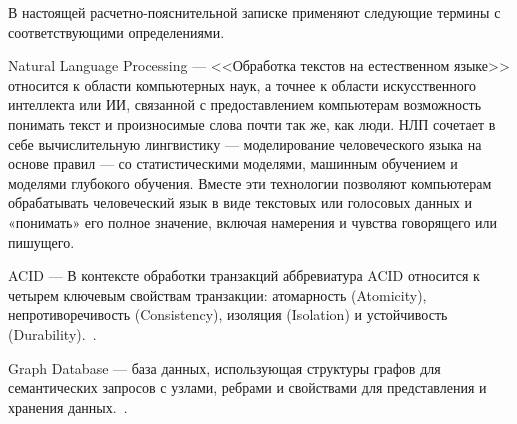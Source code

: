 
В настоящей расчетно-пояснительной записке применяют следующие термины с соответствующими определениями.\\

\begin{description}
	\item{Natural Language Processing} --- <<Обработка текстов на естественном языке>> относится к области компьютерных наук, а точнее к области искусственного интеллекта или ИИ, связанной с предоставлением компьютерам возможность понимать текст и произносимые слова почти так же, как люди.
   НЛП сочетает в себе вычислительную лингвистику — моделирование человеческого языка на основе правил — со статистическими моделями, машинным обучением и моделями глубокого обучения. Вместе эти технологии позволяют компьютерам обрабатывать человеческий язык в виде текстовых или голосовых данных и «понимать» его полное значение, включая намерения и чувства говорящего или пишущего.~\cite{nlp}
	\item{ACID} --- В контексте обработки транзакций аббревиатура ACID относится к четырем ключевым свойствам транзакции: атомарность (Atomicity), непротиворечивость (Consistency), изоляция (Isolation) и устойчивость (Durability).~\cite{gdb-def}.
	\item{Graph Database} --- база данных, использующая структуры графов для семантических запросов с узлами, ребрами и свойствами для представления и хранения данных.~\cite{gdb-def}. 
\end{description}
